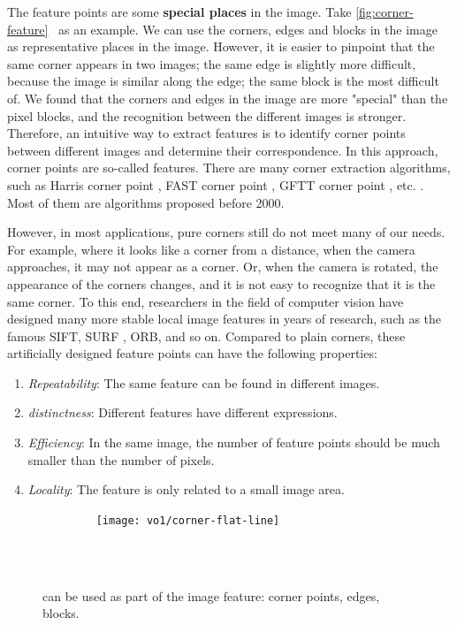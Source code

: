 The feature points are some \textbf{special places} in the image. Take \autoref{fig:corner-feature}~ as an example. We can use the corners, edges and blocks in the image as representative places in the image. However, it is easier to pinpoint that the same corner appears in two images; the same edge is slightly more difficult, because the image is similar along the edge; the same block is the most difficult of. We found that the corners and edges in the image are more "special" than the pixel blocks, and the recognition between the different images is stronger. Therefore, an intuitive way to extract features is to identify corner points between different images and determine their correspondence. In this approach, corner points are so-called features. There are many corner extraction algorithms, such as Harris corner point \textsuperscript{\cite{Harris1988}}, FAST corner point \textsuperscript{\cite{Rosten2006}}, GFTT corner point \textsuperscript{\cite{Shi1994}}, etc. . Most of them are algorithms proposed before 2000.

However, in most applications, pure corners still do not meet many of our needs. For example, where it looks like a corner from a distance, when the camera approaches, it may not appear as a corner. Or, when the camera is rotated, the appearance of the corners changes, and it is not easy to recognize that it is the same corner. To this end, researchers in the field of computer vision have designed many more stable local image features in years of research, such as the famous SIFT\textsuperscript{\cite{Lowe2004}}, SURF\textsuperscript{\cite{Bay2006}} , ORB\textsuperscript{\cite{Rublee2011}}, and so on. Compared to plain corners, these artificially designed feature points can have the following properties:

\begin{enumerate}
\item \emph{Repeatability}: The same feature can be found in different images.
\item \emph{distinctness}: Different features have different expressions.
\item \emph{Efficiency}: In the same image, the number of feature points should be much smaller than the number of pixels.
\item \emph{Locality}: The feature is only related to a small image area.
\end{enumerate}

\begin{figure}[!ht]
    \centering
    \texttt{[image: vo1/corner-flat-line]}\\
    \caption{ can be used as part of the image feature: corner points, edges, blocks. }
    \label{fig:corner-feature}
\end{figure}

